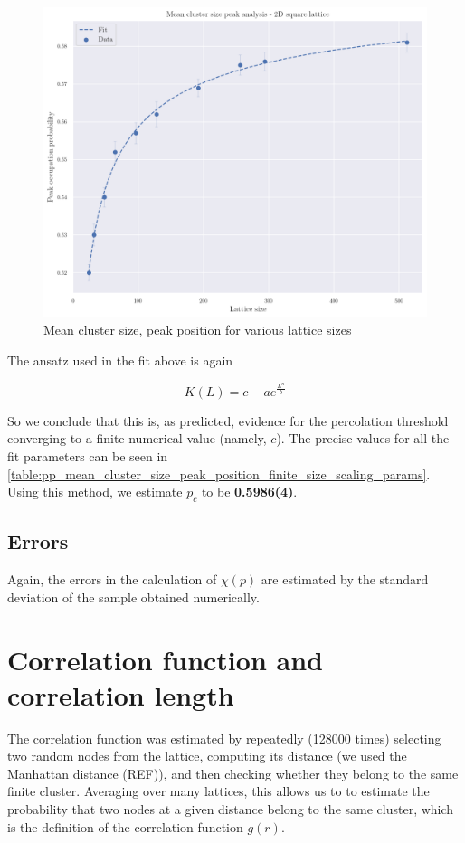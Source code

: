 \begin{figure}[H]
  \includegraphics[width=\linewidth]{Images/sim_mean_cluster_size_peak_position.png}
  \caption{Mean cluster size, peak position for various lattice sizes}
  \label{fig:sim_mean_cluster_size_peak_position}
\end{figure}


The ansatz used in the fit above is again

$$ 
    K(L) = c - a e^{\frac{L^n}{b}}
$$

So we conclude that this is, as predicted, evidence for the percolation threshold converging to a finite numerical value (namely, $c$). The precise values for all the fit parameters can be seen in \autoref{table:pp_mean_cluster_size_peak_position_finite_size_scaling_params}. Using this method, we estimate $p_c$ to be \textbf{0.5986(4)}. 

\subsection{Errors}

Again, the errors in the calculation of $\chi(p)$ are estimated by the standard deviation of the sample obtained numerically.

\section{Correlation function and correlation length}



The correlation function was estimated by repeatedly (128000 times) selecting two random nodes from the lattice, computing its distance (we used the Manhattan distance (REF)), and then checking whether they belong to the same finite cluster. Averaging over many lattices, this allows us to to estimate the probability that two nodes at a given distance belong to the same cluster, which is the definition of the correlation function $g(r)$.


